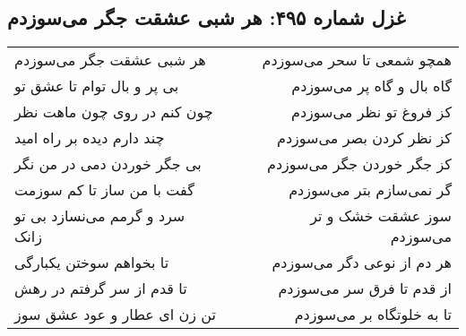 \begin{center}
\section*{غزل شماره ۴۹۵: هر شبی عشقت جگر می‌سوزدم}
\label{sec:495}
\begin{longtable}{l p{0.5cm} r}
هر شبی عشقت جگر می‌سوزدم
&&
همچو شمعی تا سحر می‌سوزدم
\\
بی پر و بال توام تا عشق تو
&&
گاه بال و گاه پر می‌سوزدم
\\
چون کنم در روی چون ماهت نظر
&&
کز فروغ تو نظر می‌سوزدم
\\
چند دارم دیده بر راه امید
&&
کز نظر کردن بصر می‌سوزدم
\\
بی جگر خوردن دمی در من نگر
&&
کز جگر خوردن جگر می‌سوزدم
\\
گفت با من ساز تا کم سوزمت
&&
گر نمی‌سازم بتر می‌سوزدم
\\
سرد و گرمم می‌نسازد بی تو زانک
&&
سوز عشقت خشک و تر می‌سوزدم
\\
تا بخواهم سوختن یکبارگی
&&
هر دم از نوعی دگر می‌سوزدم
\\
تا قدم از سر گرفتم در رهش
&&
از قدم تا فرق سر می‌سوزدم
\\
تن زن ای عطار و عود عشق سوز
&&
تا به خلوتگاه بر می‌سوزدم
\\
\end{longtable}
\end{center}
